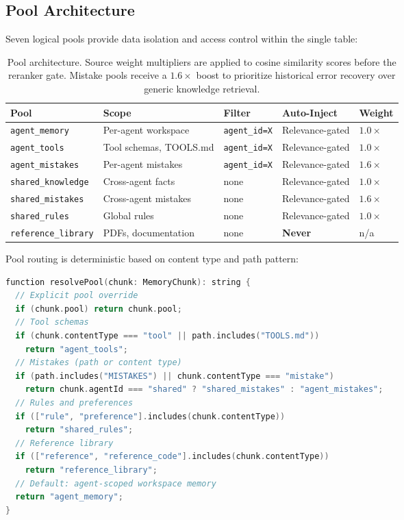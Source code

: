 \documentclass[11pt]{article}
\begin{document}
\subsection{Pool Architecture}
\label{sec:arch:pools}

Seven logical pools provide data isolation and access control within the single table:

\begin{table}[H]
\centering
\small
\begin{tabular}{lllll}
\toprule
\textbf{Pool} & \textbf{Scope} & \textbf{Filter} & \textbf{Auto-Inject} & \textbf{Weight} \\
\midrule
\texttt{agent\_memory} & Per-agent workspace & \texttt{agent\_id=X} & Relevance-gated & $1.0\times$ \\
\texttt{agent\_tools} & Tool schemas, TOOLS.md & \texttt{agent\_id=X} & Relevance-gated & $1.0\times$ \\
\texttt{agent\_mistakes} & Per-agent mistakes & \texttt{agent\_id=X} & Relevance-gated & $1.6\times$ \\
\texttt{shared\_knowledge} & Cross-agent facts & none & Relevance-gated & $1.0\times$ \\
\texttt{shared\_mistakes} & Cross-agent mistakes & none & Relevance-gated & $1.6\times$ \\
\texttt{shared\_rules} & Global rules & none & Relevance-gated & $1.0\times$ \\
\texttt{reference\_library} & PDFs, documentation & none & \textbf{Never} & n/a \\
\bottomrule
\end{tabular}
\caption{Pool architecture. Source weight multipliers are applied to cosine similarity
scores before the reranker gate. Mistake pools receive a $1.6\times$ boost to prioritize
historical error recovery over generic knowledge retrieval.}
\label{tab:pools}
\end{table}

Pool routing is deterministic based on content type and path pattern:

\begin{lstlisting}[language=C, caption={Pool routing logic (src/storage/pool.ts)}]
function resolvePool(chunk: MemoryChunk): string {
  // Explicit pool override
  if (chunk.pool) return chunk.pool;
  // Tool schemas
  if (chunk.contentType === "tool" || path.includes("TOOLS.md")) 
    return "agent_tools";
  // Mistakes (path or content type)
  if (path.includes("MISTAKES") || chunk.contentType === "mistake")
    return chunk.agentId === "shared" ? "shared_mistakes" : "agent_mistakes";
  // Rules and preferences
  if (["rule", "preference"].includes(chunk.contentType))
    return "shared_rules";
  // Reference library
  if (["reference", "reference_code"].includes(chunk.contentType))
    return "reference_library";
  // Default: agent-scoped workspace memory
  return "agent_memory";
}
\end{lstlisting}
\end{document}
